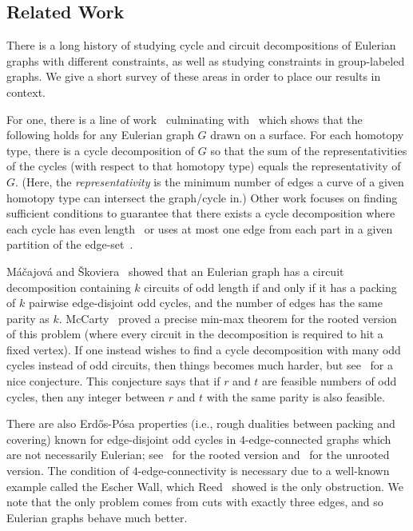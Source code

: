 \documentclass[a4paper, 12pt]{article}
\begin{document}
\subsection*{Related Work}

There is a long history of studying cycle and circuit decompositions of Eulerian graphs with different constraints, as well as studying constraints in group-labeled graphs. We give a short survey of these areas in order to place our results in context. 

For one, there is a line of work~\cite{DecomposingProjective, DecomposingKleinBottle} culminating with~\cite{DecomosingGraphsOnSurfaces} which shows that the following holds for any Eulerian graph $G$ drawn on a surface. For each homotopy type, there is a cycle decomposition of $G$ so that the sum of the representativities of the cycles (with respect to that homotopy type) equals the representativity of $G$. (Here, the \emph{representativity} is the minimum number of edges a curve of a given homotopy type can intersect the graph/cycle in.) Other work focuses on finding sufficient conditions to guarantee that there exists a cycle decomposition where each cycle has even length~\cite{EvenCircuitDecompCographs, EvenCircuitDecompLineOfCubic, EvenCircuitDecompPlanar, EvenCircuitDecomp} or uses at most one edge from each part in a given partition of the edge-set~\cite{ForbiddenPartsCircuitDecomp}.

M\'{a}\v{c}ajov\'{a} and \v{S}koviera~\cite{MacajovaOddEul} showed that an Eulerian graph has a circuit decomposition containing $k$ circuits of odd length if and only if it has a packing of $k$ pairwise edge-disjoint odd cycles, and the number of edges has the same parity as $k$. McCarty~\cite{McCartyEulerian} proved a precise min-max theorem for the rooted version of this problem (where every circuit in the decomposition is required to hit a fixed vertex).  If one instead wishes to find a {cycle} decomposition with many odd cycles instead of odd circuits, then things becomes much harder, but see~\cite{conjOddCyclesDecomp} for a nice conjecture. This conjecture says that if $r$ and $t$ are feasible numbers of odd cycles, then any integer between $r$ and $t$ with the same parity is also feasible.

There are also Erd\H{o}s-P\'{o}sa properties (i.e., rough dualities between packing and covering) known for edge-disjoint odd cycles in $4$-edge-connected graphs which are not necessarily Eulerian; see~\cite{packingRooted} for the rooted version and~\cite{ErdosPosa4EdgeConn} for the unrooted version. The condition of $4$-edge-connectivity is necessary due to a well-known example called the Escher Wall, which Reed~\cite{ReedEscherWall} showed is the only obstruction. We note that the only problem comes from cuts with exactly three edges, and so Eulerian graphs behave much better. 
\end{document}
